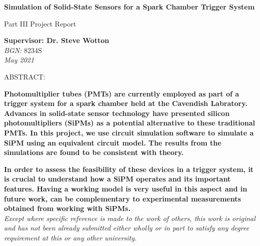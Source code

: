 \usepackage[T1]{fontenc}
\usepackage[utf8x]{inputenc}
\usepackage{libertineMono-type1}
\usepackage[libertine]{newtxmath}
\renewcommand{\familydefault}{\sfdefault}

\usepackage{amssymb,amsmath, amsfonts}
\usepackage{booktabs}
\usepackage{soul}
\usepackage{color}
\usepackage{multirow}
\usepackage{graphicx}
\usepackage{braket}
\usepackage{enumitem}
\usepackage[font=footnotesize]{caption}
\usepackage{listings}


\renewcommand*{\thefootnote}{\textbf{\arabic{footnote}}}




\begin{titlepage}
 \begin{center}
  \vspace*{2cm}

  \Huge
  \textbf{Simulation of Solid-State Sensors for a Spark Chamber Trigger System}

  \vspace{0.2cm}
  \LARGE
  Part III Project Report

  \vspace{2.5cm}

 \end{center}
 \begin{flushright}
  \Large
  \textbf{Supervisor: Dr. Steve Wotton}\\
  \textit{
   BGN:} 8234S \\
   \textit{May 2021}
\end{flushright}

\vfill
  \vspace{2cm}
  \Large
\noindent ABSTRACT:
    \normalsize

\noindent \textbf{Photomultiplier tubes (PMTs) are currently employed as part of a trigger system for a spark chamber held at the Cavendish Labratory. Advances in solid-state sensor technology have presented silicon photomultipliers (SiPMs) as a potential alternative to these traditional PMTs. In this project, we use circuit simulation software to simulate a SiPM using an equivalent circuit model. The results from the simulations are found to be consistent with theory.}

\noindent \textbf{In order to assess the feasibility of these devices in a trigger system, it is crucial to understand how a SiPM operates and its important features. Having a working model is very useful in this aspect and in future work, can be complementary to experimental measurements obtained from working with SiPMs.}
\\ \newline
\textit{Except where specific reference is made to the work of others, this work is original and has not been already submitted either wholly or in part to satisfy any degree requirement at this or any other university.}

\end{titlepage}
